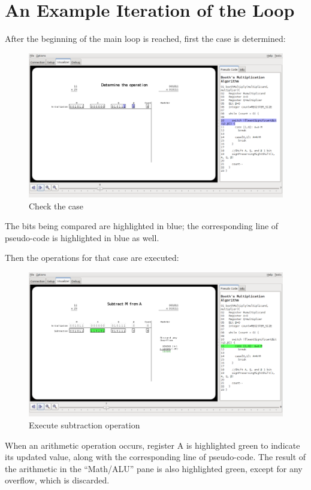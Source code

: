 \documentclass{article}
\begin{document}
\pagebreak
\section{An Example Iteration of the Loop}
After the beginning of the main loop is reached, first the case is determined:

\begin{figure}[h]
\centering
\includegraphics[scale=0.3]{cases.pdf}
\caption{Check the case}
\end{figure}

The bits being compared are highlighted in blue; the corresponding line of pseudo-code is highlighted in blue as well.

\pagebreak
Then the operations for that case are executed:

\begin{figure}[h]
\centering
\includegraphics[scale=0.3]{sub.pdf}
\caption{Execute subtraction operation}
\end{figure}

When an arithmetic operation occurs, register A is highlighted green to indicate its updated value, along with the corresponding line of pseudo-code.
The result of the arithmetic in the ``Math/ALU'' pane is also highlighted green, except for any overflow, which is discarded.
\end{document}
